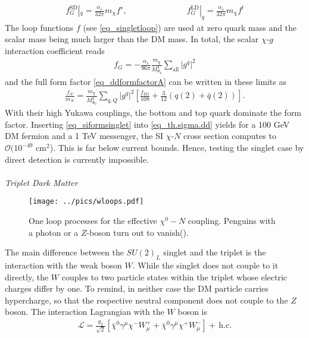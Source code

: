 \begin{align}
 f_G^\text{SD}|_q = \frac{\alpha_s}{32\pi} m_\chi f^s,\hspace{3cm} f_G^\text{LD}|_q = \frac{\alpha_s}{32\pi} m_\chi f^l
 \label{eq_ldsdLoop}
\end{align}
The loop functions $f$ (see \eqref{eq_singletloop}) are used at zero quark mass and the scalar mass being much larger than the DM mass.
In total, the scalar $\chi$-$g$ interaction coefficient reads
\begin{align}
 f_G = -\frac{\alpha_s}{96\pi} \frac{m_\chi}{M_{\Phi_q}^4} \sum\limits_{\text{all}} |g^q|^2
\end{align}
and the full form factor \eqref{eq_ddformfactorA} can be written in these limits as
\begin{align}
 \frac{f_N}{m_N} = \frac{m_\chi}{M_{\Phi_q}^4} \sum\limits_{q,Q} \left|g^q\right|^2 \left[\frac{f_{TG}}{108} + \frac{3}{12}\left(q(2) + \bar q(2)\right)\right].
 \label{eq_siformsinglet}
\end{align}
With their high Yukawa couplings, the bottom and top quark dominate the form factor. Inserting \eqref{eq_siformsinglet} into \eqref{eq_th.sigma.dd}
yields for a 100 GeV DM fermion and a 1 TeV messenger, the SI $\chi$-$N$ cross section computes to $\mathcal{O}(10^{-49}$ cm$^2$). This is far below
current bounds. Hence, testing the singlet case by direct detection is currently impossible.
\\ \\ \textit{Triplet Dark Matter}\\
\begin{figure}[t]
 \texttt{[image: ../pics/wloops.pdf]}
 \caption{One loop processes for the effective $\chi^0-N$ coupling. Penguins with a photon or a $Z$-boson turn out to vanish(\cite{1104.0228}).}
 \label{pic_wloop}
\end{figure}
\noindent The main difference between the $SU(2)_L$ singlet and the triplet is the interaction with the weak boson $W$. While the singlet does not couple to
it directly, the $W$ couples to two particle states within the triplet whose electric charges differ by one. To remind, in neither case the 
DM particle carries hypercharge, so that the respective neutral component does not couple to the $Z$ boson. The interaction Lagrangian with the $W$ 
boson is 
\begin{align}
 \mathcal{L} = \frac{g_2}{\sqrt{2}} \left[\bar \chi^0 \gamma^\mu \chi^- W^+_\mu + \bar \chi^0 \gamma^\mu \chi^+W^-_\mu\right] +\, \text{h.c.}
\end{align}
